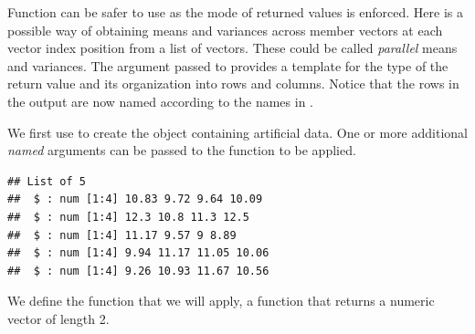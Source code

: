 \documentclass[krantz2]{krantz}\usepackage{knitr}
\begin{document}
\begin{explainbox}
Function  can be safer to use as the mode of returned values is enforced. Here is a possible way of obtaining means and variances across member vectors at each vector index position from a list of vectors. These could be called \emph{parallel} means and variances. The argument passed to  provides a template for the type of the return value and its organization into rows and columns. Notice that the rows in the output are now named according to the names in .

We first use  to create the object  containing artificial data. One or more additional \emph{named} arguments can be passed to the function to be applied.

\begin{knitrout}\footnotesize
{}\color{fgcolor}\begin{kframe}
\begin{alltt}
\hlstd{(}\hlstd{)}
 \hlkwb{<-} \hlstd{(}\hlstd{(}\hlstd{,}   \hlstd{=} \hlstd{,}  \hlstd{=} \hlstd{)}
\end{alltt}
\begin{verbatim}
## List of 5
##  $ : num [1:4] 10.83 9.72 9.64 10.09
##  $ : num [1:4] 12.3 10.8 11.3 12.5
##  $ : num [1:4] 11.17 9.57 9 8.89
##  $ : num [1:4] 9.94 11.17 11.05 10.06
##  $ : num [1:4] 9.26 10.93 11.67 10.56
\end{verbatim}
\end{kframe}
\end{knitrout}

We define the function that we will apply, a function that returns a numeric vector of length 2.

\begin{knitrout}\footnotesize
{}\color{fgcolor}\begin{kframe}
\begin{alltt}
 \hlkwb{<-} \hlstd{(}\hlstd{,}  \hlstd{=} \hlstd{) \{}
       \hlstd{(}      
    \hlstd{\}}
\end{alltt}
\end{kframe}
\end{knitrout}


\end{explainbox}
\end{document}
